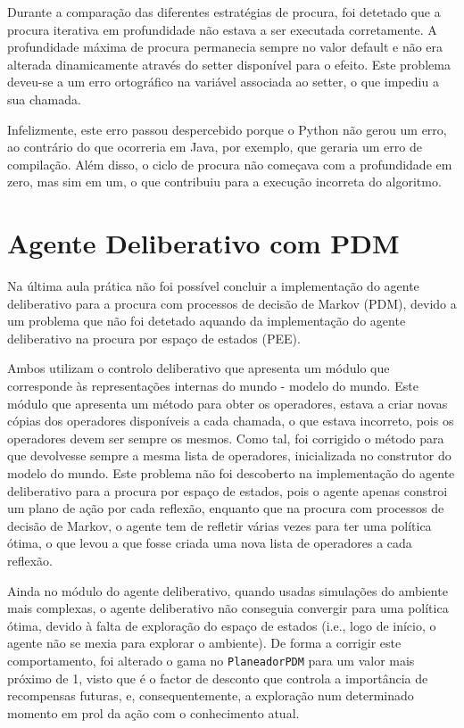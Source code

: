 Durante a comparação das diferentes estratégias de procura, foi detetado que a procura iterativa em profundidade não estava a ser executada corretamente. A profundidade máxima de procura permanecia sempre no valor default e não era alterada dinamicamente através do setter disponível para o efeito. Este problema deveu-se a um erro ortográfico na variável associada ao setter, o que impediu a sua chamada.

Infelizmente, este erro passou despercebido porque o Python não gerou um erro, ao contrário do que ocorreria em Java, por exemplo, que geraria um erro de compilação.
Além disso, o ciclo de procura não começava com a profundidade em zero, mas sim em um, o que contribuiu para a execução incorreta do algoritmo.

\section{Agente Deliberativo com PDM}\label{sec:agente-deliberativo-com-pdm}

Na última aula prática não foi possível concluir a implementação do agente deliberativo para a procura com processos de decisão de Markov (PDM), devido a um problema que não foi detetado aquando da implementação do agente deliberativo na procura por espaço de estados (PEE).

Ambos utilizam o controlo deliberativo que apresenta um módulo que corresponde às representações internas do mundo - modelo do mundo.
Este módulo que apresenta um método para obter os operadores, estava a criar novas cópias dos operadores disponíveis a cada chamada, o que estava incorreto, pois os operadores devem ser sempre os mesmos.
Como tal, foi corrigido o método para que devolvesse sempre a mesma lista de operadores, inicializada no construtor do modelo do mundo.
Este problema não foi descoberto na implementação do agente deliberativo para a procura por espaço de estados, pois o agente apenas constroi um plano de ação por cada reflexão, enquanto que na procura com processos de decisão de Markov, o agente tem de refletir várias vezes para ter uma política ótima, o que levou a que fosse criada uma nova lista de operadores a cada reflexão.

Ainda no módulo do agente deliberativo, quando usadas simulações do ambiente mais complexas, o agente deliberativo não conseguia convergir para uma política ótima, devido à falta de exploração do espaço de estados (i.e., logo de início, o agente não se mexia para explorar o ambiente).
De forma a corrigir este comportamento, foi alterado o gama no \texttt{PlaneadorPDM} para um valor mais próximo de 1, visto que é o factor de desconto que controla a importância de recompensas futuras, e, consequentemente, a exploração num determinado momento em prol da ação com o conhecimento atual.



